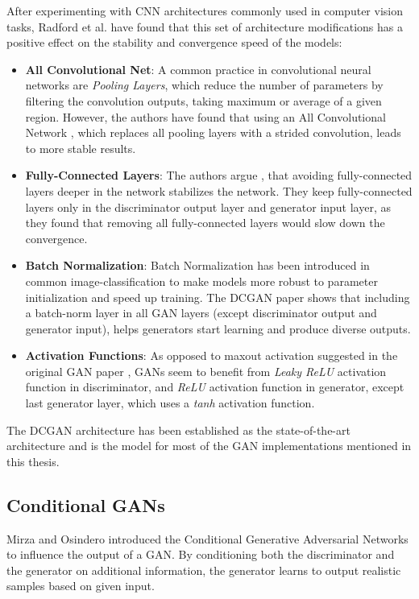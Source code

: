 \documentclass[12pt]{report}
\begin{document}
After experimenting with CNN architectures commonly used in computer vision tasks, Radford et al. \cite{radford_unsupervised_2015} have found that this set of architecture modifications has a positive effect on the stability and convergence speed of the models:
\begin{itemize}
\item \textbf{All Convolutional Net}: A common practice in convolutional neural networks are \textit{Pooling Layers}, which reduce the number of parameters by filtering the convolution outputs, taking maximum or average of a given region. However, the authors have found that using an All Convolutional Network \cite{springenberg_striving_2014}, which replaces all pooling layers with a strided convolution, leads to more stable results.
\item \textbf{Fully-Connected Layers}: The authors argue \cite{radford_unsupervised_2015}, that avoiding fully-connected layers deeper in the network stabilizes the network. They keep fully-connected layers only in the discriminator output layer and generator input layer, as they found that removing all fully-connected layers would slow down the convergence.
\item \textbf{Batch Normalization}: Batch Normalization \cite{ioffe_batch_2015} has been introduced in common image-classification to make models more robust to parameter initialization and speed up training. The DCGAN paper shows that including a batch-norm layer in all GAN layers (except discriminator output and generator input), helps generators start learning and produce diverse outputs.
\item \textbf{Activation Functions}: As opposed to maxout activation suggested in the original GAN paper \cite{goodfellow_generative_2014}, GANs seem to benefit from \textit{Leaky ReLU} activation function in discriminator, and \textit{ReLU} activation function in generator, except last generator layer, which uses a \textit{tanh} activation function.
\end{itemize}

The DCGAN architecture has been established as the state-of-the-art architecture and is the model for most of the GAN implementations mentioned in this thesis.

\subsection{Conditional GANs} \label{sec:cond_gan}
Mirza and Osindero \cite{mirza_conditional_2014} introduced the Conditional Generative Adversarial Networks to influence the output of a GAN. By conditioning both the discriminator and the generator on additional information, the generator learns to output realistic samples based on given input.
\end{document}
